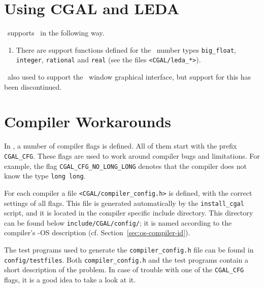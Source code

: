 
\section{Using CGAL and LEDA\label{sec:leda}}
\cgal\ supports \leda\ in the following way.

\begin{enumerate}
\item There are support functions defined for the \leda\ number types
  \texttt{big\_float}, \texttt{integer}, \texttt{rational} and
  \texttt{real} (see the files \texttt{<CGAL/leda\_*>}).
\end{enumerate}

\cgal\ also used to support the \leda\ window graphical interface,
but support for this has been discontinued.

\section{Compiler Workarounds}

In \cgal, a number of compiler flags is defined. All of them start
with the prefix \texttt{CGAL\_CFG}. These flags are used to work
around compiler bugs and limitations. For example, the flag
\texttt{CGAL\_CFG\_NO\_LONG\_LONG} denotes that the compiler does not
know the type \texttt{long long}.

For each compiler a file \texttt{<CGAL/compiler\_config.h>}
 is defined, with the correct
settings of all flags. This file is generated automatically by the
\texttt{install\_cgal} script, and it is located in the compiler
specific include directory. This directory can be found below
\texttt{include/CGAL/config/};
 it is named according to the compiler's \cgal-OS
description (cf. Section~\ref{sec:os-compiler-id}).

The test programs used to generate the \texttt{compiler\_config.h}
file can be found in \texttt{config/testfiles}.
 Both
\texttt{compiler\_config.h} and the test programs contain a short
description of the problem. In case of trouble with one of the
\texttt{CGAL\_CFG} flags, it is a good idea to take a look at it.

